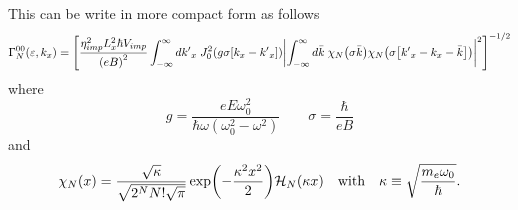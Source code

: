 \noindent
This can be write in more compact form as follows
\begin{equation} \label{5.8}
  \begin{aligned}
    \Gamma^{00}_{N}(\varepsilon,k_x)  =
    \qty[
    \frac { \eta_{imp}^2 L_x^2 \hbar V_{imp}}{\qty(eB)^2}
    \int_{-\infty}^{\infty} d {k'}_x \;
    J_0^2\qty(g\sigma[{k}_x - {k'}_x])
    \qty|
    \int_{-\infty}^{\infty} d\bar{k} \;
    {\chi}_{N}\qty(\sigma\bar{k})
    {\chi}_{N}\qty(\sigma\qty[{k'}_x - {k}_x - \bar{k}])|^2
    ]^{-1/2}
  \end{aligned}
\end{equation}
where
\begin{equation} \label{5.9}
    g = \frac{eE\omega_0^2}{\hbar\omega(\omega_0^2 - \omega^2)} \quad\quad
    \sigma = \frac{\hbar}{eB}
\end{equation}
and
\begin{equation} \label{5.10}
  \chi_N(x) = \frac{\sqrt{\kappa}}{\sqrt{2^{N}N!\sqrt{\pi}}}
  \exp(-\frac{\kappa^2 x^2}{2})
  \mathcal{H}_N\qty(\kappa x) \quad \text{with} \quad
  \kappa \equiv \sqrt{\frac{m_e \omega_0}{\hbar}}.
\end{equation}

